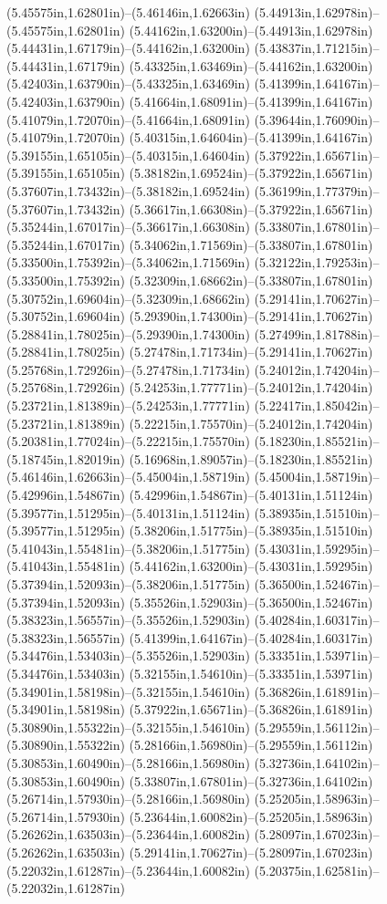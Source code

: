(5.45575in,1.62801in)--(5.46146in,1.62663in) (5.44913in,1.62978in)--(5.45575in,1.62801in) (5.44162in,1.63200in)--(5.44913in,1.62978in) (5.44431in,1.67179in)--(5.44162in,1.63200in) (5.43837in,1.71215in)--(5.44431in,1.67179in) (5.43325in,1.63469in)--(5.44162in,1.63200in) (5.42403in,1.63790in)--(5.43325in,1.63469in) (5.41399in,1.64167in)--(5.42403in,1.63790in) (5.41664in,1.68091in)--(5.41399in,1.64167in) (5.41079in,1.72070in)--(5.41664in,1.68091in) (5.39644in,1.76090in)--(5.41079in,1.72070in) (5.40315in,1.64604in)--(5.41399in,1.64167in) (5.39155in,1.65105in)--(5.40315in,1.64604in) (5.37922in,1.65671in)--(5.39155in,1.65105in) (5.38182in,1.69524in)--(5.37922in,1.65671in) (5.37607in,1.73432in)--(5.38182in,1.69524in) (5.36199in,1.77379in)--(5.37607in,1.73432in) (5.36617in,1.66308in)--(5.37922in,1.65671in) (5.35244in,1.67017in)--(5.36617in,1.66308in) (5.33807in,1.67801in)--(5.35244in,1.67017in) (5.34062in,1.71569in)--(5.33807in,1.67801in) (5.33500in,1.75392in)--(5.34062in,1.71569in) (5.32122in,1.79253in)--(5.33500in,1.75392in) (5.32309in,1.68662in)--(5.33807in,1.67801in) (5.30752in,1.69604in)--(5.32309in,1.68662in) (5.29141in,1.70627in)--(5.30752in,1.69604in) (5.29390in,1.74300in)--(5.29141in,1.70627in) (5.28841in,1.78025in)--(5.29390in,1.74300in) (5.27499in,1.81788in)--(5.28841in,1.78025in) (5.27478in,1.71734in)--(5.29141in,1.70627in) (5.25768in,1.72926in)--(5.27478in,1.71734in) (5.24012in,1.74204in)--(5.25768in,1.72926in) (5.24253in,1.77771in)--(5.24012in,1.74204in) (5.23721in,1.81389in)--(5.24253in,1.77771in) (5.22417in,1.85042in)--(5.23721in,1.81389in) (5.22215in,1.75570in)--(5.24012in,1.74204in) (5.20381in,1.77024in)--(5.22215in,1.75570in) (5.18230in,1.85521in)--(5.18745in,1.82019in) (5.16968in,1.89057in)--(5.18230in,1.85521in) (5.46146in,1.62663in)--(5.45004in,1.58719in) (5.45004in,1.58719in)--(5.42996in,1.54867in) (5.42996in,1.54867in)--(5.40131in,1.51124in) (5.39577in,1.51295in)--(5.40131in,1.51124in) (5.38935in,1.51510in)--(5.39577in,1.51295in) (5.38206in,1.51775in)--(5.38935in,1.51510in) (5.41043in,1.55481in)--(5.38206in,1.51775in) (5.43031in,1.59295in)--(5.41043in,1.55481in) (5.44162in,1.63200in)--(5.43031in,1.59295in) (5.37394in,1.52093in)--(5.38206in,1.51775in) (5.36500in,1.52467in)--(5.37394in,1.52093in) (5.35526in,1.52903in)--(5.36500in,1.52467in) (5.38323in,1.56557in)--(5.35526in,1.52903in) (5.40284in,1.60317in)--(5.38323in,1.56557in) (5.41399in,1.64167in)--(5.40284in,1.60317in) (5.34476in,1.53403in)--(5.35526in,1.52903in) (5.33351in,1.53971in)--(5.34476in,1.53403in) (5.32155in,1.54610in)--(5.33351in,1.53971in) (5.34901in,1.58198in)--(5.32155in,1.54610in) (5.36826in,1.61891in)--(5.34901in,1.58198in) (5.37922in,1.65671in)--(5.36826in,1.61891in) (5.30890in,1.55322in)--(5.32155in,1.54610in) (5.29559in,1.56112in)--(5.30890in,1.55322in) (5.28166in,1.56980in)--(5.29559in,1.56112in) (5.30853in,1.60490in)--(5.28166in,1.56980in) (5.32736in,1.64102in)--(5.30853in,1.60490in) (5.33807in,1.67801in)--(5.32736in,1.64102in) (5.26714in,1.57930in)--(5.28166in,1.56980in) (5.25205in,1.58963in)--(5.26714in,1.57930in) (5.23644in,1.60082in)--(5.25205in,1.58963in) (5.26262in,1.63503in)--(5.23644in,1.60082in) (5.28097in,1.67023in)--(5.26262in,1.63503in) (5.29141in,1.70627in)--(5.28097in,1.67023in) (5.22032in,1.61287in)--(5.23644in,1.60082in) (5.20375in,1.62581in)--(5.22032in,1.61287in) 